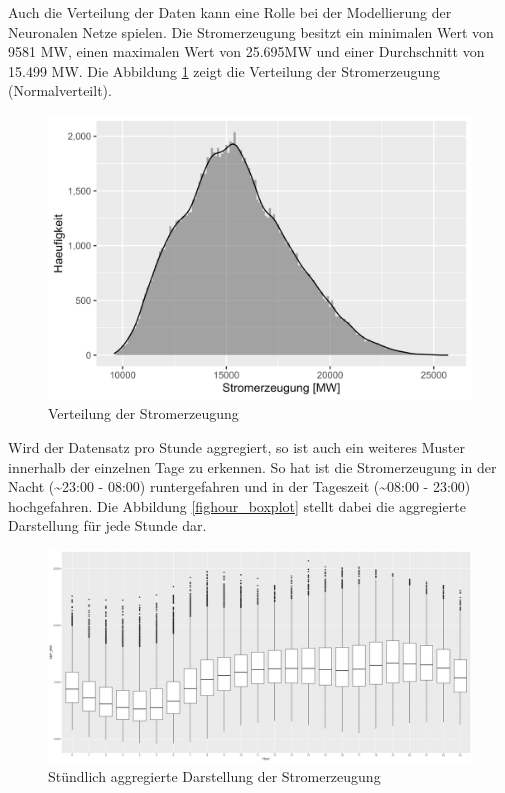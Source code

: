 \documentclass[11pt,ngerman,a4paper,]{article}
\begin{document}
Auch die Verteilung der Daten kann eine Rolle bei der Modellierung der Neuronalen Netze spielen. Die Stromerzeugung besitzt ein minimalen Wert von 9581 MW, einen maximalen Wert von 25.695MW und einer Durchschnitt von 15.499 MW. Die Abbildung \ref{fig:histogram} zeigt die Verteilung der Stromerzeugung (Normalverteilt).

\begin{figure}[H]
\centering
\includegraphics[width=1.0\textwidth]{plots/histogram.png}
\caption{Verteilung der Stromerzeugung}
\label{fig:histogram}
\end{figure}

Wird der Datensatz pro Stunde aggregiert, so ist auch ein weiteres Muster innerhalb der einzelnen Tage zu erkennen. So hat ist die Stromerzeugung in der Nacht (\textasciitilde23:00 - 08:00) runtergefahren und in der Tageszeit (\textasciitilde08:00 - 23:00) hochgefahren. Die Abbildung \ref{fighour_boxplot} stellt dabei die aggregierte Darstellung für jede Stunde dar.

\begin{figure}[H]
\centering
\includegraphics[width=1.0\textwidth]{plots/hour_boxplot.png}
\caption{Stündlich aggregierte Darstellung der Stromerzeugung}
\label{fig:hour_boxplot}
\end{figure}
\end{document}
